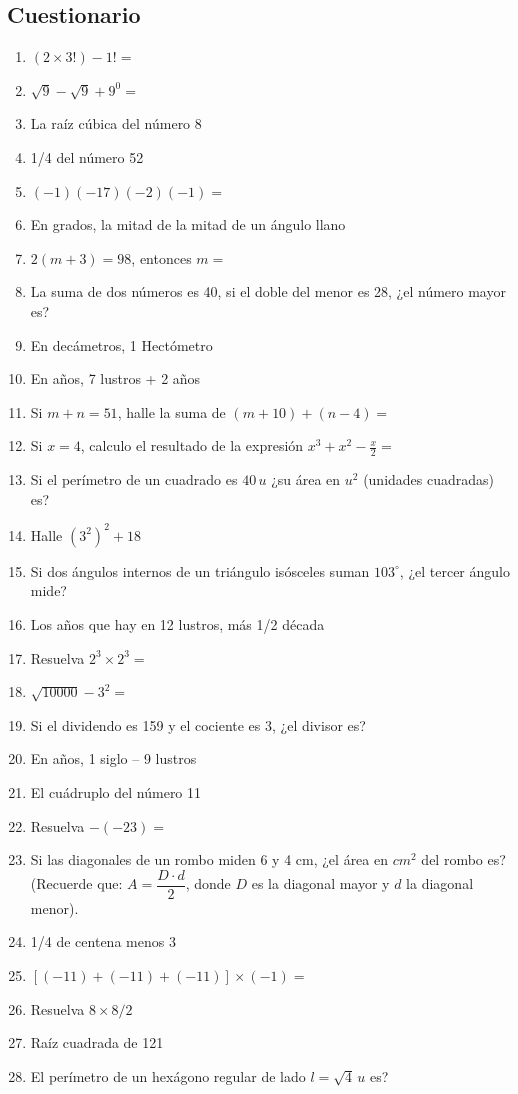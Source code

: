 \documentclass[11pt,twoside]{article}
\begin{document}
\subsection{Cuestionario}
 \begin{enumerate}
  \item $(2\times3!)-1!=$
  \item $\sqrt{9}-\sqrt{9}+9^{0}=$
  \item La raíz cúbica del número 8
  \item 1/4 del número 52
  \item $(-1)(-17)(-2)(-1)=$
  \item En grados, la mitad de la mitad de un ángulo llano
  \item $2(m+3)=98$, entonces $m=$
  \item La suma de dos números es 40, si el doble del menor es 28, ¿el número mayor es?
  \item En decámetros, 1 Hectómetro
  \item En años, 7 lustros + 2 años
  \item Si $m+n=51$, halle la suma de $(m+10)+(n-4)=$
  \item Si $x=4$, calculo el resultado de la expresión $x^{3}+x^{2}-\frac{x}{2}=$
  \item Si el perímetro de un cuadrado es $40\,u$ ¿su área en $u^{2}$ (unidades cuadradas) es?
  \item Halle $(3^{2})^{2}+18$
  \item Si dos ángulos internos de un triángulo isósceles suman $103^{\circ}$, ¿el tercer ángulo mide?
  \item Los años que hay en 12 lustros, más 1/2 década
  \newpage
  \item Resuelva $2^{3}\times2^{3}=$
  \item $\sqrt{10000}-3^{2}=$
  \item Si el dividendo es 159 y el cociente es 3, ¿el divisor es?
  \item En años, 1 siglo -- 9 lustros
  \item El cuádruplo del número 11
  \item Resuelva $-(-23)=$
  \item Si las diagonales de un rombo miden 6 y 4 cm, ¿el área en $cm^{2}$ del rombo es? (Recuerde que: $ A=\dfrac{D\cdot d}{2} $, donde $ D $ es la diagonal mayor y $ d $ la diagonal menor).
  \item 1/4 de centena menos 3
  \item $[(-11)+(-11)+(-11)]\times(-1)=$
  \item Resuelva $8\times8/2$
  \item Raíz cuadrada de 121
  \item El perímetro de un hexágono regular de lado $l=\sqrt{4}\,u$ es?
 \end{enumerate}
\end{document}
